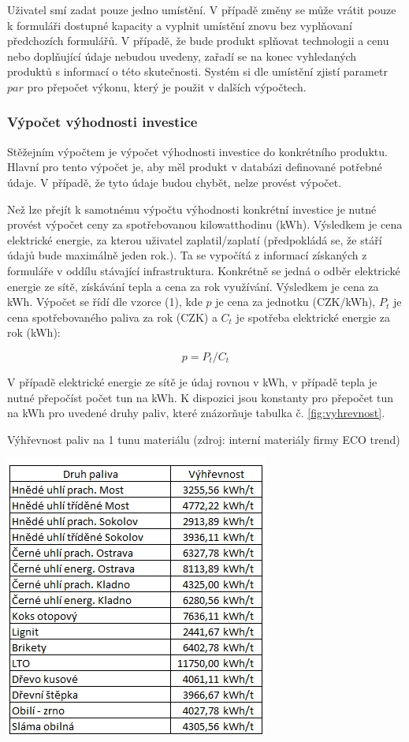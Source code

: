 \documentclass[11pt,a4paper]{article}
\newcounter{subsubsubsection}
\begin{document}
Uživatel smí zadat pouze jedno umístění. V případě změny se může vrátit pouze k formuláři dostupné kapacity a vyplnit umístění znovu bez vyplňovaní předchozích formulářů. V případě, že bude produkt splňovat technologii a cenu nebo doplňující údaje nebudou uvedeny, zařadí se na konec vyhledaných produktů s informací o této skutečnosti. Systém si dle umístění zjistí parametr $par$ pro přepočet výkonu, který je použit v dalších výpočtech. 

\subsubsection{Výpočet výhodnosti investice}
Stěžejním výpočtem je výpočet výhodnosti investice do konkrétního produktu. Hlavní pro tento výpočet je, aby měl produkt v databázi definované potřebné údaje. V případě, že tyto údaje budou chybět, nelze provést výpočet.

Než lze přejít k samotnému výpočtu výhodnosti konkrétní investice je nutné provést výpočet ceny za spotřebovanou kilowatthodinu (kWh). Výsledkem je cena elektrické energie, za kterou uživatel zaplatil/zaplatí (předpokládá se, že stáří údajů bude maximálně jeden rok.). Ta se vypočítá z informací získaných z formuláře v oddílu stávající infrastruktura. Konkrétně se jedná o odběr elektrické energie ze sítě, získávání tepla a cena za rok využívání. Výsledkem je cena za kWh. Výpočet se řídí dle vzorce (1), kde $p$ je cena za jednotku (CZK/kWh),  $P_{t}$ je cena spotřebovaného paliva za rok (CZK) a $C_{t}$ je spotřeba elektrické energie za rok (kWh): 

\begin{equation}
p = P_{t} / C_{t}
\end{equation}

\noindent V případě elektrické energie ze sítě je údaj rovnou v kWh, v případě tepla je nutné přepočíst počet tun na kWh. K dispozici jsou konstanty pro přepočet tun na kWh pro uvedené druhy paliv, které znázorňuje tabulka č. \ref{fig:vyhrevnost}.

\begin{table}[H] 
\centering 
\caption{Výhřevnost paliv na 1 tunu materiálu (zdroj: interní materiály firmy ECO trend)} 
\includegraphics[scale=0.6]{Formular_DTOZE_vyhrevnost} 
\label{fig:vyhrevnost}
\end{table} 
\end{document}
